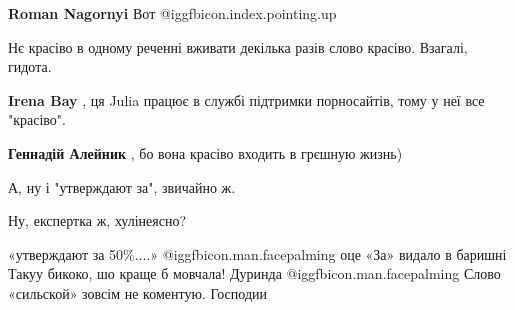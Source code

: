 \begin{itemize}
{\begin{itemize}
{\textbf{Roman Nagornyi} Вот
@igg{fbicon.index.pointing.up}
}\end{itemize}

 
Нє красіво в одному реченні вживати декілька разів слово красіво. Взагалі, гидота.

\begin{itemize}{
 
\textbf{Irena Bay} , ця Julia працює в службі підтримки порносайтів, тому у неї все "красіво".

 
\textbf{Геннадій Алейник} , бо вона красіво входить в грєшную жизнь)
}\end{itemize}

 
А, ну і "утверждают за", звичайно ж.

 

Ну, експертка ж, хулінеясно?

 

«утверждают за 50\%....» @igg{fbicon.man.facepalming}  оце «За» видало в баришні Такуу бикоко, шо
краще б мовчала! Дуринда @igg{fbicon.man.facepalming}  Слово «сильской» зовсім не коментую. Господии

}
\end{itemize}
